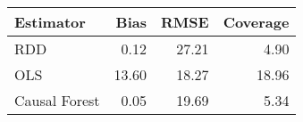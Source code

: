 \begin{table}[ht]
\centering
\begin{tabular}{lrrr}
  \hline
Estimator & Bias & RMSE & Coverage \\ 
  \hline
RDD & 0.12 & 27.21 & 4.90 \\ 
  OLS & 13.60 & 18.27 & 18.96 \\ 
  Causal Forest & 0.05 & 19.69 & 5.34 \\ 
   \hline
\end{tabular}
\end{table}
